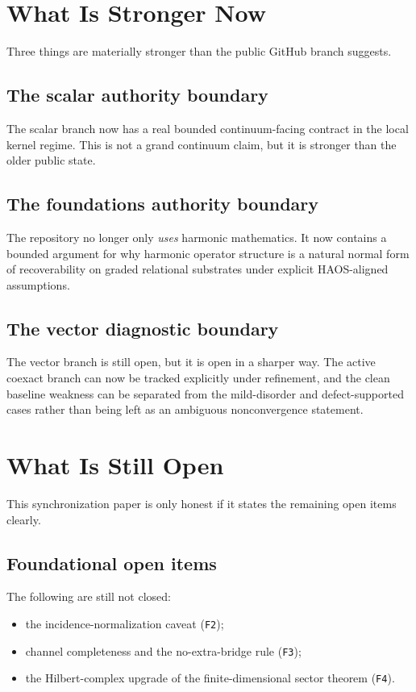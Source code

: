 \documentclass[11pt]{article}
\begin{document}
\section{What Is Stronger Now}

Three things are materially stronger than the public GitHub branch suggests.

\subsection{The scalar authority boundary}

The scalar branch now has a real bounded continuum-facing contract in the local kernel regime. This is not a grand continuum claim, but it is stronger than the older public state.

\subsection{The foundations authority boundary}

The repository no longer only \emph{uses} harmonic mathematics. It now contains a bounded argument for why harmonic operator structure is a natural normal form of recoverability on graded relational substrates under explicit HAOS-aligned assumptions.

\subsection{The vector diagnostic boundary}

The vector branch is still open, but it is open in a sharper way. The active coexact branch can now be tracked explicitly under refinement, and the clean baseline weakness can be separated from the mild-disorder and defect-supported cases rather than being left as an ambiguous nonconvergence statement.

\section{What Is Still Open}

This synchronization paper is only honest if it states the remaining open items clearly.

\subsection{Foundational open items}

The following are still not closed:
\begin{itemize}
\item the incidence-normalization caveat (\texttt{F2});
\item channel completeness and the no-extra-bridge rule (\texttt{F3});
\item the Hilbert-complex upgrade of the finite-dimensional sector theorem (\texttt{F4}).
\end{itemize}
\end{document}
